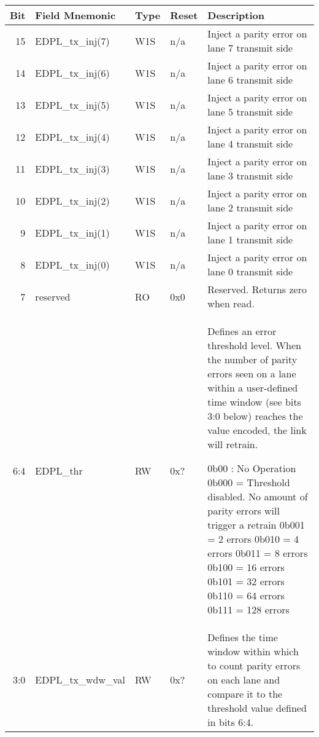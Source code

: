   \begin{tabularx}{\textwidth}{r|l|l|l|X}
  \hline
  Bit   & Field Mnemonic    & Type & Reset      & Description \\ \hline

  15    & EDPL\_tx\_inj(7) &  W1S & n/a & Inject a parity error on lane 7 transmit side \\
  14    & EDPL\_tx\_inj(6) &  W1S & n/a & Inject a parity error on lane 6 transmit side \\
  13    & EDPL\_tx\_inj(5) &  W1S & n/a & Inject a parity error on lane 5 transmit side \\
  12    & EDPL\_tx\_inj(4) &  W1S & n/a & Inject a parity error on lane 4 transmit side \\
  11    & EDPL\_tx\_inj(3) &  W1S & n/a & Inject a parity error on lane 3 transmit side \\
  10    & EDPL\_tx\_inj(2) &  W1S & n/a & Inject a parity error on lane 2 transmit side \\
  9     & EDPL\_tx\_inj(1) &  W1S & n/a & Inject a parity error on lane 1 transmit side \\
  8     & EDPL\_tx\_inj(0) &  W1S & n/a & Inject a parity error on lane 0 transmit side \\
  7     & reserved &  RO & 0x0 & Reserved. Returns zero when read. \\
  6:4   & EDPL\_thr &  RW & 0x? & Defines an error threshold level. When the number of parity errors seen on a lane within a user-defined time window (see bits 3:0 below) reaches the value encoded, the link will retrain.

  \setlength\parindent{24pt}
  \indent 0b00 : No Operation   \newline
  \indent 0b000 = Threshold disabled. No amount of parity \newline \indent \indent errors will trigger a retrain \newline
  \indent 0b001 = 2 errors  \newline
  \indent 0b010 = 4 errors  \newline
  \indent 0b011 = 8 errors  \newline
  \indent 0b100 = 16 errors \newline
  \indent 0b101 = 32 errors \newline
  \indent 0b110 = 64 errors \newline
  \indent 0b111 = 128 errors \\

  3:0   & EDPL\_tx\_wdw\_val &  RW & 0x? & Defines the time window within which to count parity errors on each lane and compare it to the threshold value defined in bits 6:4.


\end{tabularx}
